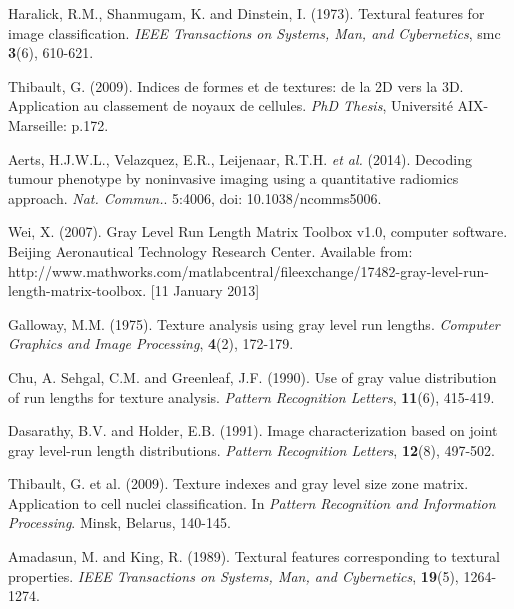 \documentclass{article}
\begin{document}
\footnotesize
\begin{thebibliography}{99} %

	 Haralick, R.M., Shanmugam, K. and Dinstein, I. (1973).
			{Textural features for image classification}.
			{\em IEEE Transactions on Systems, Man, and Cybernetics}, smc \textbf{3}(6), 	
			610-621.	
	
		 Thibault, G. (2009). 
			{Indices de formes et de textures: de la 2D vers la 3D. Application au classement de noyaux de cellules}. 
			{\em PhD Thesis}, Universit\'e AIX-Marseille: p.172.
			
	 Aerts, H.J.W.L., Velazquez, E.R., Leijenaar, R.T.H. \textit{et al.} (2014).
			{Decoding tumour phenotype by noninvasive imaging using a quantitative radiomics approach}.
			{\em Nat. Commun.}. 5:4006, doi: 10.1038/ncomms5006.
			
	 Wei, X. (2007). 
			{Gray Level Run Length Matrix Toolbox v1.0, computer software}.
			{Beijing Aeronautical Technology Research Center}.
			{Available from: http://www.mathworks.com/matlabcentral/fileexchange/17482-gray-level-run-length-matrix-toolbox}. [11 January 2013]
	
	 Galloway, M.M. (1975).
			{Texture analysis using gray level run lengths}.
			{\em Computer Graphics and Image Processing}, \textbf{4}(2), 172-179.	
			
	 Chu, A. Sehgal, C.M. and Greenleaf, J.F. (1990).
			{Use of gray value distribution of run lengths for texture analysis}.
			{\em Pattern Recognition Letters}, \textbf{11}(6), 415-419.
			
	 Dasarathy, B.V. and Holder, E.B. (1991).
			{Image characterization based on joint gray level-run length distributions}.
			{\em Pattern Recognition Letters}, \textbf{12}(8), 497-502.
	
	 Thibault, G. et al. (2009).
			{Texture indexes and gray level size zone matrix. Application to cell nuclei 
			classification}. In {\em Pattern Recognition and Information Processing}. 
			Minsk, Belarus, 140-145.
					
	 Amadasun, M. and King, R. (1989).
			{Textural features corresponding to textural properties}.
			{\em IEEE Transactions on Systems, Man, and Cybernetics}, \textbf{19}(5), 1264-1274. 		
					
\end{thebibliography}
\end{document}
